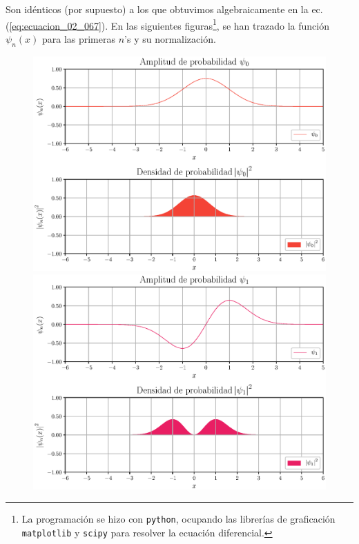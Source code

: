 Son idénticos (por supuesto) a los que obtuvimos algebraicamente en la ec. (\ref{eq:ecuacion_02_067}).
\newpage
En las siguientes figuras\footnote{La programación se hizo con \texttt{python}, ocupando las librerías de graficación \texttt{matplotlib} y \texttt{scipy} para resolver la ecuación diferencial.}, se han trazado la función $\psi_{n} (x)$ para las primeras $n$'s y su normalización.
\begin{figure}[H]
    \centering
    \includegraphics[scale=0.6]{Imagenes/Funcion_Onda_00.eps}
    \includegraphics[scale=0.6]{Imagenes/Funcion_Onda_01.eps}
\end{figure}
